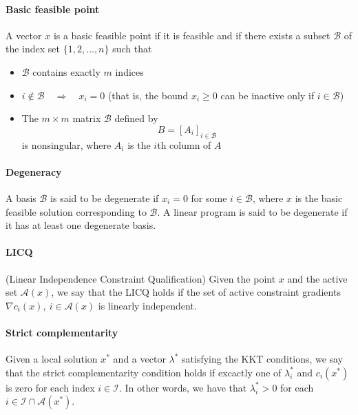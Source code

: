 \paragraph{Basic feasible point} A vector $x$ is a basic feasible point if it is feasible and if there exists a subset $\mathcal{B}$ of the index set $\{ 1, 2, \dots, n \}$ such that
%
\begin{itemize}[nolistsep,noitemsep]
    \item $\mathcal{B}$ contains exactly $m$ indices
    \item $i \notin \mathcal{B} \quad \Rightarrow \quad x_i = 0$ (that is, the bound $x_i \geq 0$ can be inactive only if $i \in \mathcal{B}$)
    \item The $m \times m$ matrix $\mathcal{B}$ defined by 
    \begin{equation}
        B = [A_i]_{i \in \mathcal{B}}
    \end{equation}
    is nonsingular, where $A_i$ is the $i$th column of $A$
\end{itemize}

\paragraph{Degeneracy} A basis $\mathcal{B}$ is said to be degenerate if $x_i = 0$ for some $i \in \mathcal{B}$, where $x$ is the basic feasible solution corresponding to $\mathcal{B}$. A linear program is said to be degenerate if it has at least one degenerate basis.

\paragraph{LICQ} (Linear Independence Constraint Qualification) Given the point $x$ and the active set $\mathcal{A}(x)$, we say that the LICQ holds if the set of active constraint gradients $\nabla c_i (x), \: i \in \mathcal{A}(x)$ is linearly independent.

\paragraph{Strict complementarity} Given a local solution $x^*$ and a vector $\lambda^*$ satisfying the KKT conditions, we say that the strict complementarity condition holds if excactly one of $\lambda_i^*$ and $c_i(x^*)$ is zero for each index $i \in \mathcal{I}$. In other words, we have that $\lambda_i^* > 0$ for each $i \in \mathcal{I} \cap \mathcal{A} (x^*)$.

